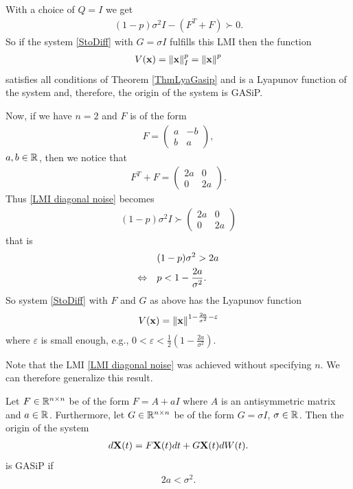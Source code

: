 \documentclass[a4paper,12pt,twoside,BCOR=10mm]{scrbook}
\begin{document}
With a choice of $Q = I$ we get
\begin{align}\label{LMI diagonal noise}
    (1 - p)\sigma^2 I - (F^T + F) \succ 0.
\end{align}
So if the system \eqref{StoDiff} with $G = \sigma I$ fulfills this LMI then the function
\begin{align*}
    V(\mathbf{x}) = \left\lVert\mathbf{x}\right\rVert_{I}^{p} = \left\lVert\mathbf{x}\right\rVert^p 
\end{align*}
satisfies all conditions of Theorem \ref{ThmLyaGasip} and is a Lyapunov function of the system and, therefore, the origin of the system is GASiP.

Now, if we have $n = 2$ and $F$ is of the form
\begin{align*}
    F =
    \begin{pmatrix}
    a & -b\\
    b & a
    \end{pmatrix},
\end{align*}
$a,b \in \mathbb{R}^{}$, then we notice that
\begin{align*}
    F^T + F =
    \begin{pmatrix}
    2a & 0\\
    0 & 2a
    \end{pmatrix}.
\end{align*}
Thus \eqref{LMI diagonal noise} becomes
\begin{align*}
    (1 - p)\sigma^2 I \succ 
    \begin{pmatrix}
    2a & 0\\
    0 & 2a
    \end{pmatrix}
\end{align*}
that is
\begin{align*}
    &(1 - p)\sigma^2 > 2a\\
    \Leftrightarrow \quad& p < 1 - \frac{2a}{\sigma^2}.
\end{align*}
So system \eqref{StoDiff} with $F$ and $G$ as above has the Lyapunov function
\begin{align*}
    V(\mathbf{x}) = \left\lVert\mathbf{x}\right\rVert^{1 - \frac{2a}{\sigma^2} - \varepsilon}
\end{align*}
where $\varepsilon$ is small enough, e.g., $0 < \varepsilon < \frac{1}{2}\left(1 - \frac{2a}{\sigma^2}\right)$.

Note that the LMI \eqref{LMI diagonal noise} was achieved without specifying $n$. We can therefore generalize this result.
\begin{theorem}\label{ThmLyapunovFunc sI Fas n2 U1}
Let $F\in\mathbb{R}^{n\times n}$ be of the form $F = A + aI$ where $A$ is an antisymmetric matrix and $a \in \mathbb{R}^{}$. Furthermore, let $G \in \mathbb{R}^{n \times n}$ be of the form $G = \sigma I$, $\sigma\in \mathbb{R}^{}$. Then the origin of the system
\begin{align*}
    d\mathbf{X}(t) = F\mathbf{X}(t)dt + G\mathbf{X}(t)dW(t).
\end{align*}
is GASiP if
\begin{align*}
2a < \sigma^2.
\end{align*}
\end{theorem}
\end{document}

